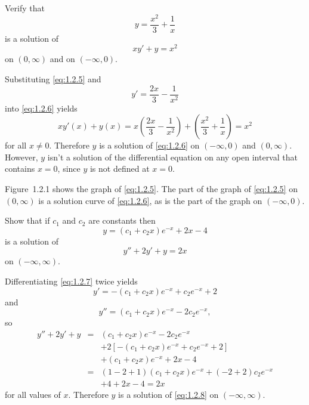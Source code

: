 \setcounter{example}{1}
\setcounter{equation}{4}
\begin{example}
  \label{example:1.2.2} \rm Verify that
  \begin{equation}
    \label{eq:1.2.5}y=\frac{x^{2}}{3}+\frac{1}{x}
  \end{equation}
  is a solution of
  \begin{equation}
    \label{eq:1.2.6}xy'+y=x^{2}
  \end{equation}
  on $(0,\infty)$ and on $(-\infty,0)$.
\end{example}
\begin{examplesolution}
\solution Substituting \eqref{eq:1.2.5} and
\[
  y'=\frac{2x}{3}-\frac{1}{x^{2}}
\]
into \eqref{eq:1.2.6} yields
\[
  xy'(x)+y(x)=x\left(\frac{2x}{3}-\frac{1}{x^{2}}\right)+ \left(\frac{x^{2}}{3}+\frac{1}{x}\right)=x^{2}
\]
for all $x\ne0$. Therefore $y$ is a solution of \eqref{eq:1.2.6} on $(-\infty,0)$ and $(0,\infty)$.
However, $y$ isn't a solution of the differential equation on any open interval that contains $x=0$,
since $y$ is not defined at $x=0$.

Figure~1.2.1 shows the graph of \eqref{eq:1.2.5}. The part of the graph of
\eqref{eq:1.2.5} on $(0,\infty)$ is a solution curve of \eqref{eq:1.2.6}, as is the part of the
graph on $(-\infty,0)$.
\end{examplesolution}

\setcounter{example}{2}
\setcounter{equation}{6}
\begin{example}
  \label{example:1.2.3} \rm Show that if $c_{1}$ and $c_{2}$ are constants then
  \begin{equation}
    \label{eq:1.2.7}y=(c_{1}+c_{2}x)e^{-x}+2x-4
  \end{equation}
  is a solution of
  \begin{equation}
    \label{eq:1.2.8}y''+2y'+y=2x
  \end{equation}
  on $(-\infty,\infty)$.
\end{example}
\begin{examplesolution}
\solution Differentiating \eqref{eq:1.2.7} twice yields
\[
  y'=-(c_{1}+c_{2}x)e^{-x}+c_{2}e^{-x}+2
\]
and
\[
  y''=(c_{1}+c_{2}x)e^{-x}-2c_{2}e^{-x},
\]
so
\begin{eqnarray*}
  y''+2y'+y & = & (c_{1}+c_{2}x)e^{-x}-2c_{2}e^{-x}                  \\
            &   & +2\left[-(c_{1}+c_{2}x)e^{-x}+c_{2}e^{-x}+2\right] \\
            &   & +(c_{1}+c_{2}x)e^{-x}+2x-4                         \\
            & = & (1-2+1)(c_{1}+c_{2}x)e^{-x}+(-2+2)c_{2}e^{-x}      \\
            &   & +4+2x-4=2x
\end{eqnarray*}
for all values of $x$. Therefore $y$ is a solution of \eqref{eq:1.2.8} on $(-\infty,\infty)$.
\end{examplesolution}

